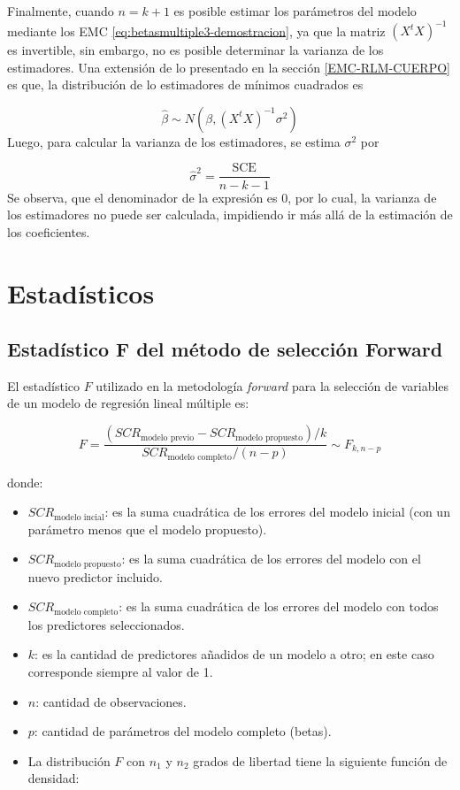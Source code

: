 \documentclass[
  11pt,
]{book}
\providecommand{\tightlist}{%
  \setlength{\itemsep}{0pt}\setlength{\parskip}{0pt}}
\theoremstyle{definition}
\theoremstyle{definition}
\theoremstyle{definition}
\theoremstyle{definition}
\theoremstyle{remark}
\begin{document}
Finalmente, cuando \(n=k+1\) es posible estimar los parámetros del modelo mediante los EMC \eqref{eq:betasmultiple3-demostracion}, ya que la matriz \((X^tX)^{-1}\) es invertible, sin embargo, no es posible determinar la varianza de los estimadores. Una extensión de lo presentado en la sección \ref{EMC-RLM-CUERPO} es que, la distribución de lo estimadores de mínimos cuadrados es

\[
\widehat{\beta} \sim N(\beta, (X^tX)^{-1}\sigma^2)
\]
Luego, para calcular la varianza de los estimadores, se estima \(\sigma^2\) por

\[
\widehat{\sigma}^2 = \frac{\text{SCE}}{n-k-1}
\]
Se observa, que el denominador de la expresión es 0, por lo cual, la varianza de los estimadores no puede ser calculada, impidiendo ir más allá de la estimación de los coeficientes.

\chapter{Estadísticos}\label{estaduxedsticos}

\section{Estadístico F del método de selección Forward}\label{F-forward}

El estadístico \(F\) utilizado en la metodología \emph{forward} para la selección de variables de un modelo de regresión lineal múltiple es:

\begin{equation}
F = \displaystyle\frac{(SCR_{\text{modelo previo}} - SCR_{\text{modelo propuesto}})/k}{SCR_{\text{modelo completo}}/(n-p)} \sim F_{k, n-p}
\label{eq:EstadisticoFforward}
\end{equation}

donde:

\begin{itemize}
\tightlist
\item
  \(SCR_{\text{modelo incial}}\): es la suma cuadrática de los errores del modelo inicial (con un parámetro menos que el modelo propuesto).
\item
  \(SCR_{\text{modelo propuesto}}\): es la suma cuadrática de los errores del modelo con el nuevo predictor incluido.
\item
  \(SCR_{\text{modelo completo}}\): es la suma cuadrática de los errores del modelo con todos los predictores seleccionados.
\item
  \(k\): es la cantidad de predictores añadidos de un modelo a otro; en este caso corresponde siempre al valor de 1.
\item
  \(n\): cantidad de observaciones.
\item
  \(p\): cantidad de parámetros del modelo completo (betas).
\item
  La distribución \(F\) con \(n_1\) y \(n_2\) grados de libertad tiene la siguiente función de densidad:
\end{itemize}
\end{document}
